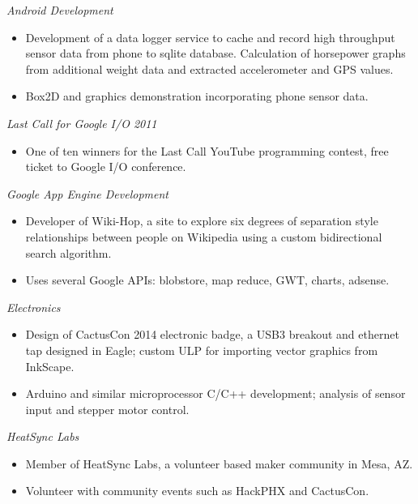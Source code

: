 \documentclass[line,margin]{res}
\begin{document}
\begin{resume}
          \emph{Android Development}
          \begin{itemize} \itemsep -2pt
          \item
            Development of a data logger service to cache and record high throughput sensor data from phone to sqlite database. Calculation of horsepower graphs from additional weight data and extracted accelerometer and GPS values.
          \item
            Box2D and graphics demonstration incorporating phone sensor data.
          \end{itemize}

          \emph{Last Call for Google I/O 2011}
          \begin{itemize} \itemsep -2pt
          \item
            One of ten winners for the Last Call YouTube programming contest, free ticket to Google I/O conference.
          \end{itemize}

          \emph{Google App Engine Development}
          \begin{itemize} \itemsep -2pt
          \item
            Developer of Wiki-Hop, a site to explore six degrees of separation style
            relationships between people on Wikipedia using a custom bidirectional search algorithm.
          \item
            Uses several Google APIs: blobstore, map reduce, GWT, charts, adsense.
          \end{itemize}

          \emph{Electronics}
          \begin{itemize} \itemsep -2pt
          \item
            Design of CactusCon 2014 electronic badge, a USB3 breakout and ethernet tap designed in Eagle; custom ULP for importing
            vector graphics from InkScape.
          \item
            Arduino and similar microprocessor C/C++ development; analysis of sensor input and stepper motor control.
          \end{itemize}


          \emph{HeatSync Labs}
          \begin{itemize} \itemsep -2pt %
          \item
            Member of HeatSync Labs, a volunteer based maker community in Mesa, AZ.
          \item
            Volunteer with community events such as HackPHX and CactusCon.
          \end{itemize}\

\end{resume}
\end{document}
